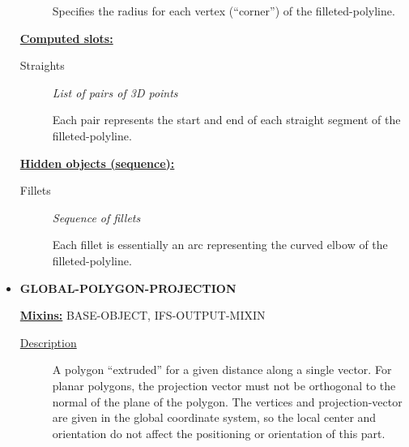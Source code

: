 \documentclass [11pt]{book}
\begin{document}
\begin{itemize}
\begin{description}
 Specifies the radius for each vertex (``corner'') of the filleted-polyline.




\end{description}






\textbf{
\underline{Computed slots:}}

\begin{description}

\item [Straights]
\emph{List of pairs of 3D points}

 Each pair represents the start and end of each straight segment of the
filleted-polyline.




\end{description}






\textbf{
\underline{Hidden objects (sequence):}}

\begin{description}

\item [Fillets]
\emph{Sequence of fillets}

 Each fillet is essentially an arc representing the curved elbow
of the filleted-polyline.




\end{description}







\item {}
\label{prim:global-polygon-projection}
\textbf{GLOBAL-POLYGON-PROJECTION}


\textbf{
\underline{Mixins:}} BASE-OBJECT, IFS-OUTPUT-MIXIN





\begin{description}

\item [
\underline{Description}]


A polygon ``extruded'' for a given distance along a single vector.
For planar polygons, the projection vector must not be orthogonal to the normal of the plane of
the polygon. The vertices and projection-vector are given in the global coordinate system, so
the local center and orientation do not affect the positioning or orientation of this part.




\end{description}
\end{itemize}
\end{document}
